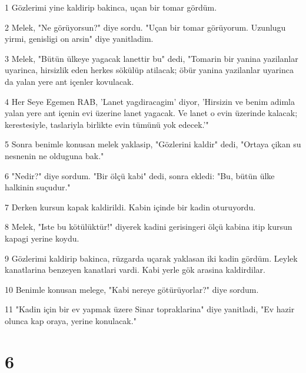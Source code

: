 \par 1 Gözlerimi yine kaldirip bakinca, uçan bir tomar gördüm.
\par 2 Melek, "Ne görüyorsun?" diye sordu. "Uçan bir tomar görüyorum. Uzunlugu yirmi, genisligi on arsin" diye yanitladim.
\par 3 Melek, "Bütün ülkeye yagacak lanettir bu" dedi, "Tomarin bir yanina yazilanlar uyarinca, hirsizlik eden herkes sökülüp atilacak; öbür yanina yazilanlar uyarinca da yalan yere ant içenler kovulacak.
\par 4 Her Seye Egemen RAB, 'Lanet yagdiracagim' diyor, 'Hirsizin ve benim adimla yalan yere ant içenin evi üzerine lanet yagacak. Ve lanet o evin üzerinde kalacak; kerestesiyle, taslariyla birlikte evin tümünü yok edecek.'"
\par 5 Sonra benimle konusan melek yaklasip, "Gözlerini kaldir" dedi, "Ortaya çikan su nesnenin ne olduguna bak."
\par 6 "Nedir?" diye sordum. "Bir ölçü kabi" dedi, sonra ekledi: "Bu, bütün ülke halkinin suçudur."
\par 7 Derken kursun kapak kaldirildi. Kabin içinde bir kadin oturuyordu.
\par 8 Melek, "Iste bu kötülüktür!" diyerek kadini gerisingeri ölçü kabina itip kursun kapagi yerine koydu.
\par 9 Gözlerimi kaldirip bakinca, rüzgarda uçarak yaklasan iki kadin gördüm. Leylek kanatlarina benzeyen kanatlari vardi. Kabi yerle gök arasina kaldirdilar.
\par 10 Benimle konusan melege, "Kabi nereye götürüyorlar?" diye sordum.
\par 11 "Kadin için bir ev yapmak üzere Sinar topraklarina" diye yanitladi, "Ev hazir olunca kap oraya, yerine konulacak."

\chapter{6}

